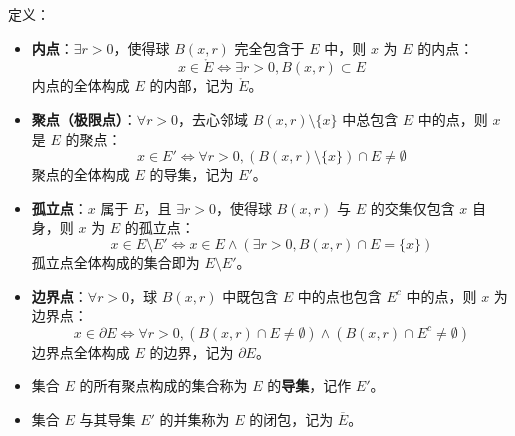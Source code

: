 \begin{definition}[内点、边界点与聚点]

定义：

\begin{itemize}
  \item {\textbf{内点}：$\displaystyle \exists r > 0$，使得球 $\displaystyle B(x, r)$ 完全包含于 $\displaystyle E$ 中，则 $\displaystyle x$ 为 $\displaystyle E$ 的内点：$$
\displaystyle x \in \mathring{E} \iff \exists r > 0, B(x, r) \subset E$$
内点的全体构成 $\displaystyle E$ 的内部，记为 $\displaystyle \mathring{E}$。

}\item {\textbf{聚点（极限点）}：$\displaystyle \forall r > 0$，去心邻域 $\displaystyle B(x, r) \setminus \lbrace x \rbrace$ 中总包含 $\displaystyle E$ 中的点，则 $\displaystyle x$ 是 $\displaystyle E$ 的聚点：$$
\displaystyle x \in E' \iff \forall r > 0, (B(x, r) \setminus \lbrace x \rbrace) \cap E \ne \emptyset$$
聚点的全体构成 $\displaystyle E$ 的导集，记为 $\displaystyle E'$。

}\item {\textbf{孤立点}：$\displaystyle x$ 属于 $\displaystyle E$，且 $\displaystyle \exists r > 0$，使得球 $\displaystyle B(x, r)$ 与 $\displaystyle E$ 的交集仅包含 $\displaystyle x$ 自身，则 $\displaystyle x$ 为 $\displaystyle E$ 的孤立点：$$
\displaystyle x \in E \setminus E' \iff x \in E \land (\exists r > 0, B(x, r) \cap E = \lbrace x \rbrace)$$
孤立点全体构成的集合即为 $\displaystyle E \setminus E'$。

}\item {\textbf{边界点}：$\displaystyle \forall r > 0$，球 $\displaystyle B(x, r)$ 中既包含 $\displaystyle E$ 中的点也包含 $\displaystyle E^c$ 中的点，则 $\displaystyle x$ 为边界点：$$
\displaystyle x \in \partial E \iff \forall r > 0, (B(x, r) \cap E \ne \emptyset) \land (B(x, r) \cap E^c \ne \emptyset)$$
边界点全体构成 $\displaystyle E$ 的边界，记为 $\displaystyle \partial E$。

}
\end{itemize}

\end{definition}

\begin{itemize}
  \item {集合 $\displaystyle E$ 的所有聚点构成的集合称为 $\displaystyle E$ 的\textbf{导集}，记作 $\displaystyle E'$。}\item {集合 $\displaystyle E$ 与其导集 $\displaystyle E'$ 的并集称为 $\displaystyle E$ 的闭包，记为 $\displaystyle \overline{E}$。}
\end{itemize}


